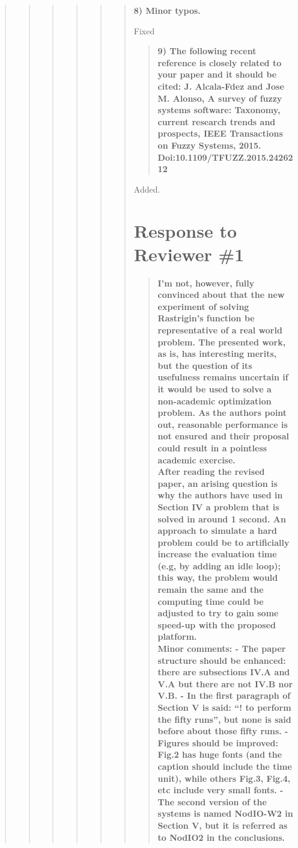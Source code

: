 \documentclass[preprint]{elsarticle}
\begin{document}
\begin{quote}
\begin{quote}
\begin{quote}
\begin{quote}
\begin{quote}
\begin{quote}
\textbf{8) Minor typos.\\}

Fixed

\begin{quote}
\textbf{9) The following recent reference is closely related to your paper and it should be cited:
J. Alcala-Fdez and Jose M. Alonso, A survey of fuzzy systems software: Taxonomy, current research trends and prospects, IEEE Transactions on Fuzzy Systems, 2015. Doi:10.1109/TFUZZ.2015.2426212}
\end{quote}

Added. 

\section{Response to Reviewer \#1}


\begin{quote}
\textbf{I'm not, however, fully convinced about that the new experiment of solving Rastrigin's function be representative of a real world problem. The presented work, as is, has interesting merits, but the question of its usefulness remains uncertain if it would be used to solve a non-academic optimization problem. As the authors point out, reasonable performance is not ensured and their proposal could result in a pointless academic exercise.\\
After reading the revised paper, an arising question is why the authors have used in Section IV a problem that is solved in around 1 second. An approach to simulate a hard problem could be to artificially increase the evaluation time (e.g, by adding an idle loop); this way, the problem would remain the same and the computing time could be adjusted to try to gain some speed-up with the proposed platform.\\
Minor comments:
- The paper structure should be enhanced: there are subsections IV.A and V.A but there are not
IV.B nor V.B.
- In the first paragraph of Section V is said: ``! to perform the fifty runs'', but none is said before
about those fifty runs.
- Figures should be improved: Fig.2 has huge fonts (and the caption should include the time unit),
while others Fig.3, Fig.4, etc include very small fonts.
- The second version of the systems is named NodIO-W2 in Section V, but it is referred as to
NodIO2 in the conclusions.}
\end{quote}




\end{quote}
\end{quote}
\end{quote}
\end{quote}
\end{quote}
\end{quote}
\end{document}
